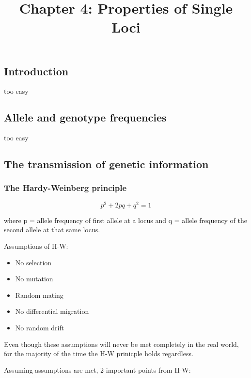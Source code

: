 \documentclass[
]{article}
\title{Chapter 4: Properties of Single Loci}
\author{}
\date{\vspace{-2.5em}}
\providecommand{\tightlist}{%
  \setlength{\itemsep}{0pt}\setlength{\parskip}{0pt}}
\begin{document}
\maketitle

\hypertarget{introduction}{%
\subsection{Introduction}\label{introduction}}

too easy

\hypertarget{allele-and-genotype-frequencies}{%
\subsection{Allele and genotype
frequencies}\label{allele-and-genotype-frequencies}}

too easy

\hypertarget{the-transmission-of-genetic-information}{%
\subsection{The transmission of genetic
information}\label{the-transmission-of-genetic-information}}

\hypertarget{the-hardy-weinberg-principle}{%
\subsubsection{The Hardy-Weinberg
principle}\label{the-hardy-weinberg-principle}}

\[p^2 + 2pq + q^2 = 1\]

where p = allele frequency of first allele at a locus and q = allele
frequency of the second allele at that same locus.

Assumptions of H-W:

\begin{itemize}
\tightlist
\item
  No selection
\item
  No mutation
\item
  Random mating
\item
  No differential migration
\item
  No random drift
\end{itemize}

Even though these assumptions will never be met completely in the real
world, for the majority of the time the H-W prinicple holds regardless.

Assuming assumptions are met, 2 important points from H-W:
\end{document}
